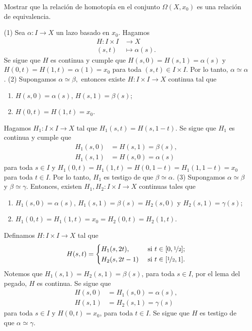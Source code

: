 \begin{ejercicio}
    Mostrar que la relación de homotopía en el conjunto $\Omega(X,x_0)$ es una relación de equivalencia.
\end{ejercicio}

\begin{demostracion}
(1) Sea $\alpha: I\to X$ un lazo basado en $x_0$. Hagamos 
\begin{align*}
    H:I\times I&\to X\\
    (s,t)&\mapsto \alpha(s).
\end{align*}
Se sigue que $H$ es continua y cumple que $H(s,0)=H(s,1)=\alpha(s)$ y $H(0,t)=H(1,t)=\alpha(1)=x_0$ para toda $(s,t)\in I\times I$. Por lo tanto, $\alpha\simeq \alpha$. (2) Supongamos $\alpha\simeq\beta,$ entonces existe $H:I\times I\to X$ continua tal que 
\begin{enumerate}[label=(\arabic*)]
    \item $H(s,0)=\alpha(s)$, $H(s,1)=\beta(s)$;
    \item $H(0,t)=H(1,t)=x_0$.
\end{enumerate}
Hagamos $H_1:I\times I\to X$ tal que $H_1(s,t)=H(s,1-t)$. Se sigue que $H_1$ es continua y cumple que 
\begin{align*}
    H_1(s,0)&=H(s,1)=\beta(s),\\
    H_1(s,1)&=H(s,0)=\alpha(s)
\end{align*}
para toda $s\in I$ y $H_1(0,t)=H_1(1,t)=H(0,1-t)=H_1(1,1-t)=x_0$ para toda $t\in I$. Por lo tanto, $H_1$ es testigo de que $\beta\simeq \alpha$. (3) Supongamos $\alpha\simeq\beta$ y $\beta\simeq \gamma$. Entonces, existen $H_1,H_2:I\times I\to X$ continuas tales que
\begin{enumerate}[label=(\arabic*)]
    \item $H_1(s,0)=\alpha(s)$, $H_1(s,1)=\beta(s)=H_2(s,0)$ y $H_2(s,1)=\gamma(s)$;
    \item $H_1(0,t)=H_1(1,t)=x_0=H_2(0,t)=H_2(1,t)$.
\end{enumerate}
Definamos $H:I\times I\to X$ tal que
\begin{equation*}
    H(s,t)=\begin{cases}
        H_1(s,2t), & \text{ si } t\in[0,\nicefrac{1}{2}];\\[0.25ex]
        H_2(s,2t-1) & \text{ si } t\in [\nicefrac{1}{2},1].
    \end{cases}
\end{equation*}
Notemos que $H_1(s,1)=H_2(s,1)=\beta(s)$, para toda $s\in I$, por el lema del pegado, $H$ es continua. Se sigue que 
\begin{align*}
    H(s,0)&=H_1(s,0)=\alpha(s),\\
    H(s,1)&=H_2(s,1)=\gamma(s)
\end{align*}
para toda $s\in I$ y $H(0,t)=x_0$, para toda $t\in I$. Se sigue que $H$ es testigo de que $\alpha\simeq \gamma$.
\end{demostracion}
